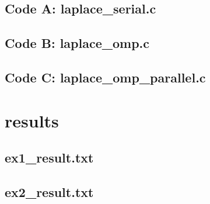 \documentclass[11pt]{article}
\begin{document}
\subsection{Code A: laplace\_serial.c}


\begin{footnotesize}

\end{footnotesize}




\subsection{Code B: laplace\_omp.c}


\begin{footnotesize}

\end{footnotesize}




\subsection{Code C: laplace\_omp\_parallel.c}


\begin{footnotesize}

\end{footnotesize}



\section{results}

\subsection{ex1\_result.txt}
\begin{footnotesize}
 
\end{footnotesize}

\subsection{ex2\_result.txt}
\begin{footnotesize}
 
\end{footnotesize}
\end{document}
